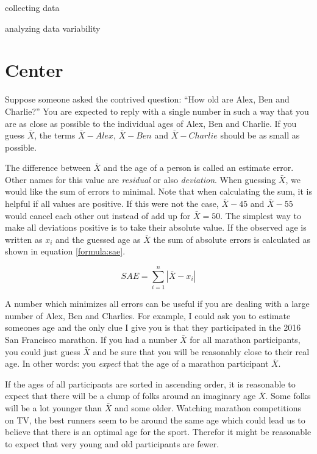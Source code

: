 \documentclass{tufte-book} %
\begin{document}
collecting data

analyzing data
variability


\section{Center}

Suppose someone asked the contrived question: ``How old are Alex, Ben and Charlie?'' You are expected to reply with a single number in such a way that you are as close as possible to the individual ages of Alex, Ben and Charlie. If you guess $\bar{X}$, the terms $\bar{X} - Alex$, $\bar{X} - Ben$ and $\bar{X} - Charlie$ should be as small as possible.

The difference between $\bar{X}$ and the age of a person is called an estimate error. Other names for this value are {\em residual} or also {\em deviation}. When guessing $\bar{X}$, we would like the sum of errors to minimal. Note that when calculating the sum, it is helpful if all values are positive. If this were not the case, $\bar{X} - 45$ and $\bar{X} - 55$ would cancel each other out instead of add up for $\bar{X} = 50$. The simplest way to make all deviations positive is to take their absolute value. If the observed age is written as $x_i$ and the guessed age as $\bar{X}$ the sum of absolute errors is calculated as shown in equation \ref{formula:sae}.

\begin{equation} \label{formula:sae}
	SAE = \sum_{i=1}^n |\bar{X} - x_i|
\end{equation}

A number which minimizes all errors can be useful if you are dealing with a large number of Alex, Ben and Charlies. For example, I could ask you to estimate someones age and the only clue I give you is that they participated in the 2016 San Francisco marathon. If you had a number $\bar{X}$ for all marathon participants, you could just guess $\bar{X}$ and be sure that you will be reasonably close to their real age. In other words: you {\em expect} that the age of a marathon participant $\bar{X}$.

If the ages of all participants are sorted in ascending order, it is reasonable to expect that there will be a clump of folks around an imaginary age $\bar{X}$. Some folks will be a lot younger than $\bar{X}$ and some older. Watching marathon competitions on TV, the best runners seem to be around the same age which could lead us to believe that there is an optimal age for the sport. Therefor it might be reasonable to expect that very young and old participants are fewer. 
\end{document}
